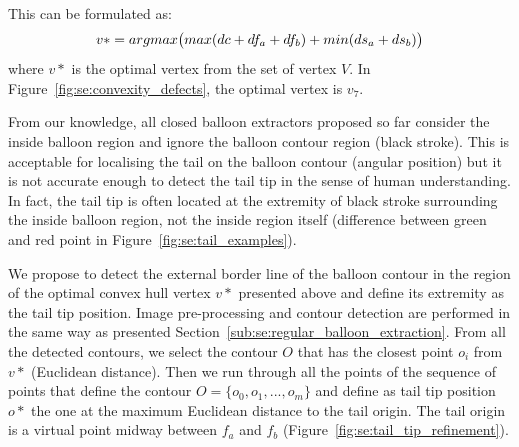 This can be formulated as:
\begin{equation}\label{eq:se:optimisation}
   v* = argmax\big( max(dc+df_a+df_b) + min(ds_a + ds_b) \big)\\
 \end{equation}
 where $v*$ is the optimal vertex from the set of vertex $V$.
In Figure~\ref{fig:se:convexity_defects}, the optimal vertex is $v_7$.


From our knowledge, all closed balloon extractors proposed so far consider the inside balloon region and ignore the balloon contour region (black stroke).
This is acceptable for localising the tail on the balloon contour (angular position) but it is not accurate enough to detect the tail tip in the sense of human understanding.
In fact, the tail tip is often located at the extremity of black stroke surrounding the inside balloon region, not the inside region itself (difference between green and red point in Figure~\ref{fig:se:tail_examples}).



We propose to detect the external border line of the balloon contour in the region of the optimal convex hull vertex $v*$ presented above and define its extremity as the tail tip position.
Image pre-processing and contour detection are performed in the same way as presented Section~\ref{sub:se:regular_balloon_extraction}.
From all the detected contours, we select the contour $O$ that has the closest point $o_i$ from $v*$ (Euclidean distance).
Then we run through all the points of the sequence of points that define the contour $O=\{o_0, o_1,...,o_m\}$ and define as tail tip position $o*$ the one at the maximum Euclidean distance to the tail origin.
The tail origin is a virtual point midway between $f_a$ and $f_b$ (Figure~\ref{fig:se:tail_tip_refinement}).

